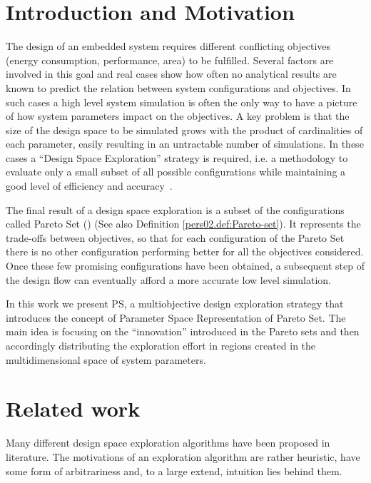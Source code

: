 
\section{Introduction and Motivation}

The design of an embedded system requires different conflicting
objectives (energy consumption, performance, area) to be fulfilled.
Several factors are involved in this goal and real cases show how
often no analytical results are known to predict the relation between
system configurations and objectives. In such cases a high level
system simulation is often the only way to have a picture of how system
parameters impact on the objectives.  A key problem is that the size
of the design space to be simulated grows with the product of
cardinalities of each parameter, easily resulting in an untractable number
of simulations. In these cases a ``Design Space
Exploration'' strategy is required, i.e. a methodology to evaluate
only a small subset of all possible configurations while maintaining a
good level of efficiency and accuracy~\cite{surviving_soc}.

The final result of a design space exploration is a subset of the
configurations called Pareto Set (\cite{pareto}) (See also Definition
\ref{pers02.def:Pareto-set}). It represents the trade-offs between
objectives, so that for each configuration of the Pareto Set there is no
other configuration performing better for all the objectives
considered. Once these few promising configurations have been obtained, a
subsequent step of the design flow can eventually afford a more
accurate low level simulation.

In this work we present PS, a multiobjective design exploration
strategy that introduces the concept of Parameter Space Representation
of Pareto Set. The main idea is focusing on the ``innovation''
introduced in the Pareto sets and then accordingly distributing the
exploration effort in regions created in the multidimensional space of
system parameters. 

\section{Related work}
Many different design space exploration algorithms have been proposed
in literature.  The motivations of an exploration
algorithm are rather heuristic, have some form of arbitrariness and,
to a large extend, intuition lies behind them.

